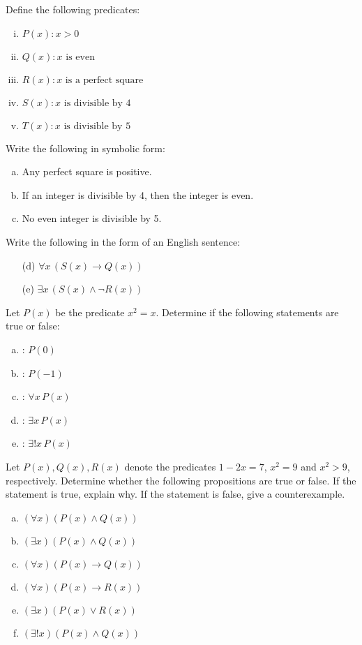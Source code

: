 \documentclass[11pt,letterpaper]{article}
\begin{document}
 Define the following predicates:
	\begin{enumerate}[(i)]
	\item $P(x) \colon x > 0$
	\item $Q(x) \colon x \text{ is even}$
	\item $R(x) \colon x \text{ is a perfect square}$
	\item $S(x) \colon x \text{ is divisible by }4$
	\item $T(x) \colon x \text{ is divisible by }5$
	\end{enumerate}
Write the following in symbolic form:
	\begin{enumerate}[(a)]
	\item Any perfect square is positive. 
	\item If an integer is divisible by 4, then the integer is even. 
	\item No even integer is divisible by 5. 
	\end{enumerate}
Write the following in the form of an English sentence:
	\begin{enumerate}
	\item[(d)] $\forall x\, (S(x) \to Q(x))$
	\item[(e)] $\exists x\, (S(x) \wedge \neg R(x))$
	\end{enumerate}



\newpage



 Let $P(x)$ be the predicate $x^2= x$. Determine if the following statements are true or false:
	\begin{enumerate}[(a)]
	\item \uans{1.5cm}: $P(0)$
	\item \uans{1.5cm}: $P(-1)$
	\item \uans{1.5cm}: $\forall x\, P(x)$
	\item \uans{1.5cm}: $\exists x\, P(x)$
	\item \uans{1.5cm}: $\exists! x\, P(x)$
	\end{enumerate}



\newpage



 Let $P(x), Q(x), R(x)$ denote the predicates $1 - 2x= 7$, $x^2= 9$ and $x^2 > 9$, respectively. Determine whether the following propositions are true or false. If the statement is true, explain why. If the statement is false, give a counterexample. 
        \begin{enumerate}[(a)]
        \item $(\forall x)(P(x) \wedge Q(x))$
        \item $(\exists x)(P(x) \wedge Q(x))$
        \item $(\forall x)(P(x) \to Q(x))$
        \item $(\forall x)(P(x) \to R(x))$
        \item $(\exists x)(P(x) \vee R(x))$
        \item $(\exists! x)(P(x) \wedge Q(x))$ 
        \end{enumerate}
\end{document}

